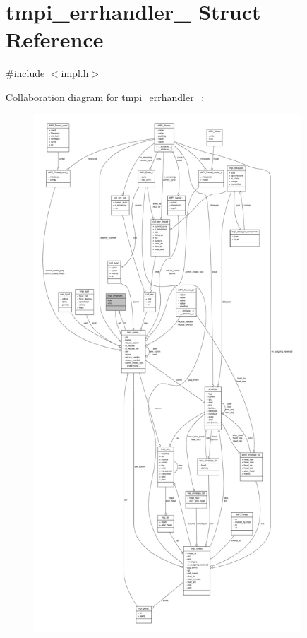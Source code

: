 \hypertarget{structtmpi__errhandler__}{\section{tmpi\-\_\-errhandler\-\_\- \-Struct \-Reference}
\label{structtmpi__errhandler__}
}


{\ttfamily \#include $<$impl.\-h$>$}



\-Collaboration diagram for tmpi\-\_\-errhandler\-\_\-\-:
\nopagebreak
\begin{figure}[H]
\begin{center}
\leavevmode
\includegraphics[height=550pt]{structtmpi__errhandler____coll__graph}
\end{center}
\end{figure}
